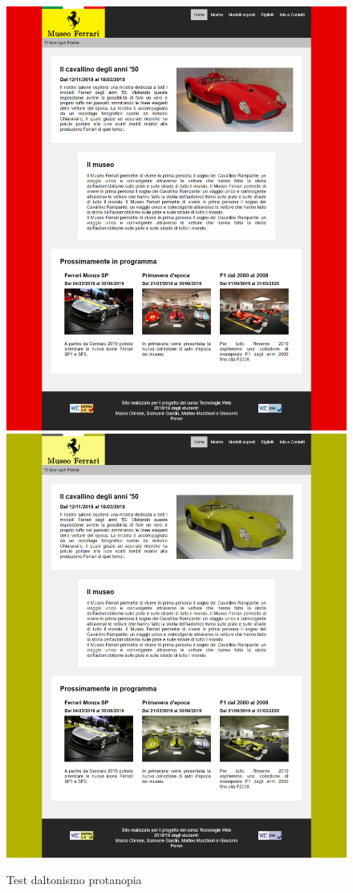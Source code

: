 \begin{figure}[!h]
	\begin{center}
		\includegraphics[scale=0.144]{Images/original.png}
		\includegraphics[scale=0.6]{Images/protanopia.png}
		\caption{Test daltonismo protanopia}
	\end{center}
\end{figure}
